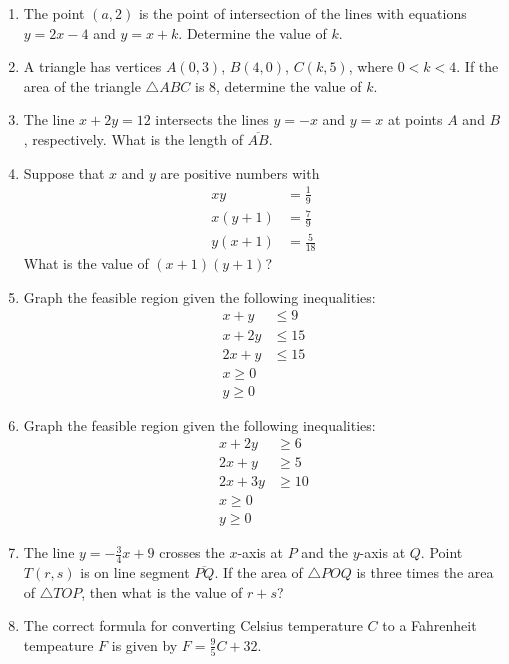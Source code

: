 \documentclass[english,12pt]{article}
\theoremstyle{plain}
\theoremstyle{definition}
\theoremstyle{definition} %
\newcommand{\enum}[1]{\begin{enumerate} #1 \end{enumerate}}
\begin{document}
\enum{



\item The point $(a,2)$ is the point of intersection of the lines with equations $y=2x-4$ and $y=x+k$.  Determine the value of $k$.

\item A triangle has vertices $A(0,3)$, $B(4,0)$, $C(k,5)$, where $0<k<4$.  If the area of the triangle $\triangle ABC$ is $8$, determine the value of $k$.

\item The line $x+2y=12$ intersects the lines $y=-x$ and $y=x$ at points $A$ and $B$, respectively.  What is the length of $\overline{AB}$.

\item Suppose that $x$ and $y$ are positive numbers with
\begin{align*}
xy &=\frac{1}{9}\\
x(y + 1) &=\frac{7}{9}\\
y(x + 1) &=\frac{5}{18}
\end{align*}
What is the value of $(x + 1)(y + 1)$?



\item Graph the feasible region given the following inequalities:
\begin{align*}
x+y&\le 9\\
x+2y&\le 15\\
2x+y&\le 15\\
x\ge 0\\
y\ge 0
\end{align*}

\item Graph the feasible region given the following inequalities:
\begin{align*}
x+2y&\ge 6\\
2x+y&\ge 5\\
2x+3y&\ge 10\\
x\ge 0\\
y\ge 0
\end{align*}

\item
The line $y = -\frac{3}{4}x + 9$ crosses the $x$-axis at $P$ and the
$y$-axis at $Q$. Point $T(r, s)$ is on line segment $\overline{PQ}$. If the
area of $\triangle POQ$ is three times the area of $\triangle TOP$, then
what is the value of $r + s$?

\item The correct formula for converting  Celsius temperature $C$ to a Fahrenheit tempeature $F$ is given by $F=\frac{9}{5}C+32$.

}
\end{document}
